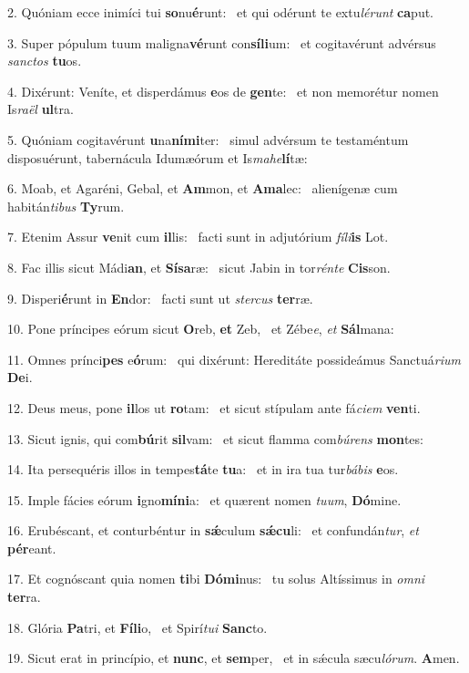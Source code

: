 2. Quóniam ecce inimíci tui \textbf{so}nu\textbf{é}runt: \ast\  et qui odérunt te extu\textit{lé}\textit{runt} \textbf{ca}put.\

3. Super pópulum tuum maligna\textbf{vé}runt con\textbf{sí}\textbf{li}um: \ast\  et cogitavérunt advérsus \textit{sanc}\textit{tos} \textbf{tu}os.\

4. Dixérunt: Veníte, et disperdámus \textbf{e}os de \textbf{gen}te: \ast\  et non memorétur nomen Is\textit{ra}\textit{ël} \textbf{ul}tra.\

5. Quóniam cogitavérunt \textbf{u}na\textbf{ní}\textbf{mi}ter: \ast\  simul advérsum te testaméntum disposuérunt, tabernácula Idumæórum et Is\textit{ma}\textit{he}\textbf{lí}tæ:\

6. Moab, et Agaréni, Gebal, et \textbf{Am}mon, et \textbf{A}\textbf{ma}lec: \ast\  alienígenæ cum habitán\textit{ti}\textit{bus} \textbf{Ty}rum.\

7. Etenim Assur \textbf{ve}nit cum \textbf{il}lis: \ast\  facti sunt in adjutórium \textit{fí}\textit{li}\textbf{is} Lot.\

8. Fac illis sicut Mádi\textbf{an}, et \textbf{Sí}\textbf{sa}ræ: \ast\  sicut Jabin in tor\textit{rén}\textit{te} \textbf{Cis}son.\

9. Disperi\textbf{é}runt in \textbf{En}dor: \ast\  facti sunt ut \textit{ster}\textit{cus} \textbf{ter}ræ.\

10. Pone príncipes eórum sicut \textbf{O}reb, \textbf{et} Zeb, \ast\  et Zébe\textit{e}, \textit{et} \textbf{Sál}mana:\

11. Omnes prínci\textbf{pes} e\textbf{ó}rum: \ast\  qui dixérunt: Hereditáte possideámus Sanctuá\textit{ri}\textit{um} \textbf{De}i.\

12. Deus meus, pone \textbf{il}los ut \textbf{ro}tam: \ast\  et sicut stípulam ante fá\textit{ci}\textit{em} \textbf{ven}ti.\

13. Sicut ignis, qui com\textbf{bú}rit \textbf{sil}vam: \ast\  et sicut flamma com\textit{bú}\textit{rens} \textbf{mon}tes:\

14. Ita persequéris illos in tempes\textbf{tá}te \textbf{tu}a: \ast\  et in ira tua tur\textit{bá}\textit{bis} \textbf{e}os.\

15. Imple fácies eórum \textbf{i}gno\textbf{mí}\textbf{ni}a: \ast\  et quærent nomen \textit{tu}\textit{um}, \textbf{Dó}mine.\

16. Erubéscant, et conturbéntur in \textbf{sǽ}culum \textbf{sǽ}\textbf{cu}li: \ast\  et confundán\textit{tur}, \textit{et} \textbf{pér}eant.\

17. Et cognóscant quia nomen \textbf{ti}bi \textbf{Dó}\textbf{mi}nus: \ast\  tu solus Altíssimus in \textit{om}\textit{ni} \textbf{ter}ra.\

18. Glória \textbf{Pa}tri, et \textbf{Fí}\textbf{li}o, \ast\  et Spirí\textit{tu}\textit{i} \textbf{Sanc}to.\

19. Sicut erat in princípio, et \textbf{nunc}, et \textbf{sem}per, \ast\  et in sǽcula sæcu\textit{ló}\textit{rum}. \textbf{A}men.\

